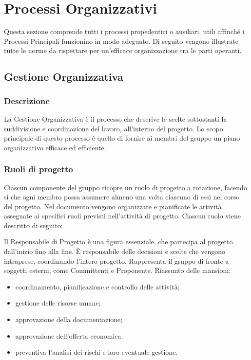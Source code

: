 \section{Processi Organizzativi}
	Questa sezione comprende tutti i processi propedeutici o ausiliari, utili affinché i Processi Principali funzionino in modo adeguato. Di seguito vengono illustrate tutte le norme da rispettare per un'efficace organizzazione tra le parti operanti.

	\subsection{Gestione Organizzativa}
	
		\subsubsection{Descrizione}
			La Gestione Organizzativa è il processo che descrive le scelte sottostanti la suddivisione e coordinazione del lavoro, all'interno del progetto. Lo scopo principale di questo processo è quello di fornire ai membri del gruppo un piano organizzativo efficace ed efficiente.
			
		\subsubsection{Ruoli di progetto}
			Ciascun componente del gruppo ricopre un ruolo di progetto a rotazione, facendo sì che ogni membro possa assumere almeno una volta ciascuno di essi nel corso del progetto. Nel documento \PdP{} vengono organizzate e pianificate le attività assegnate ai specifici ruoli previsti nell'attività di progetto. Ciascun ruolo viene descritto di seguito:
			
			Il Responsabile di Progetto è una figura essenziale, che partecipa al progetto dall'inizio fino alla fine. È responsabile delle decisioni e scelte che vengono intraprese, coordinando l'intero progetto. Rappresenta il gruppo di fronte a soggetti esterni, come Committenti e Proponente.
			Riassunto delle mansioni:
			\begin{itemize}
				\item coordinamento, pianificazione e controllo delle attività;
				\item gestione delle risorse umane;
				\item approvazione della documentazione;
				\item approvazione dell'offerta economica;
				\item preventiva l'analisi dei rischi e loro eventuale gestione.
			\end{itemize}
			
